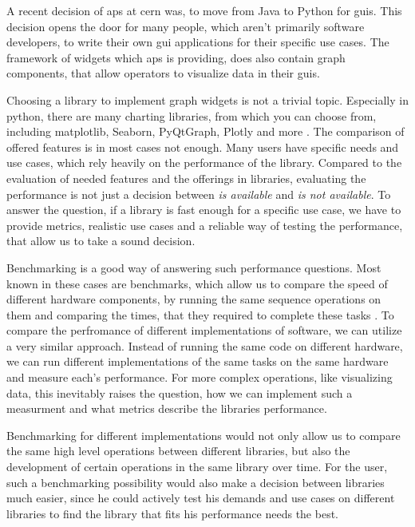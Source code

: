A recent decision of \gls{aps} at \gls{cern} was, to move from Java to Python for \glspl{gui}. This decision opens the door for many people, which aren't primarily software developers, to write their own \gls{gui} applications for their specific use cases. The framework of widgets which \gls{aps} is providing, does also contain graph components, that allow operators to visualize data in their \glspl{gui}.

Choosing a library to implement graph widgets is not a trivial topic. Especially in python, there are many charting libraries, from which you can choose from, including matplotlib, Seaborn, PyQtGraph, Plotly and more \cite{PyDataVisLibs}. The comparison of offered features is in most cases not enough. Many users have specific needs and use cases, which rely heavily on the performance of the library. Compared to the evaluation of needed features and the offerings in libraries, evaluating the performance is not just a decision between \emph{is available} and \emph{is not available}. To answer the question, if a library is fast enough for a specific use case, we have to provide metrics, realistic use cases and a reliable way of testing the performance, that allow us to take a sound decision.

Benchmarking is a good way of answering such performance questions. Most known in these cases are benchmarks, which allow us to compare the speed of different hardware components, by running the same sequence operations on them and comparing the times, that they required to complete these tasks \cite{OverviewBenchmarks}. To compare the perfromance of different implementations of software, we can utilize a very similar approach. Instead of running the same code on different hardware, we can run different implementations of the same tasks on the same hardware and measure each's performance. For more complex operations, like visualizing data, this inevitably raises the question, how we can implement such a measurment and what metrics describe the libraries performance.

Benchmarking for different implementations would not only allow us to compare the same high level operations between different libraries, but also the development of certain operations in the same library over time. For the user, such a benchmarking possibility would also make a decision between libraries much easier, since he could actively test his demands and use cases on different libraries to find the library that fits his performance needs the best.




